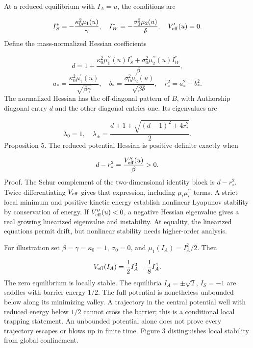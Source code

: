 \documentclass[aip,adv,preprint,floatfix]{revtex4-2}
\begin{document}
At a reduced equilibrium with $I_A=u$, the conditions are

\begin{equation}
I_S^*=-\frac{\kappa_0^2\mu_1(u)}{\gamma},\quad I_W^*=-\frac{\sigma_0^2\mu_2(u)}{\delta},\quad V_{\rm eff}^\prime(u)=0.
\end{equation}
Define the mass-normalized Hessian coefficients

\begin{equation}
d=1+\frac{\kappa_0^2\mu_1^{\prime\prime}(u)I_S^*+\sigma_0^2\mu_2^{\prime\prime}(u)I_W^*}{\beta},
\end{equation}
\begin{equation}
a_*=\frac{\kappa_0^2\mu_1^\prime(u)}{\sqrt{\beta\gamma}},\quad b_*=\frac{\sigma_0^2\mu_2^\prime(u)}{\sqrt{\beta\delta}},\quad r_*^2=a_*^2+b_*^2.
\end{equation}
The normalized Hessian has the off-diagonal pattern of $B$, with Authorship diagonal entry $d$ and the other diagonal entries one. Its eigenvalues are

\begin{equation}
\lambda_0=1,\quad \lambda_\pm=\frac{d+1\pm\sqrt{(d-1)^2+4r_*^2}}{2}.
\end{equation}
Proposition 5. The reduced potential Hessian is positive definite exactly when

\begin{equation}
d-r_*^2=\frac{V_{\rm eff}^{\prime\prime}(u)}{\beta}>0.
\end{equation}
Proof. The Schur complement of the two-dimensional identity block is $d-r_*^2$. Twice differentiating $V_{\rm eff}$ gives that expression, including $\mu_i\mu_i^{\prime\prime}$ terms. A strict local minimum and positive kinetic energy establish nonlinear Lyapunov stability by conservation of energy. If $V_{\rm eff}^{\prime\prime}(u)<0$, a negative Hessian eigenvalue gives a real growing linearized eigenvalue and instability. At equality, the linearized equations permit drift, but nonlinear stability needs higher-order analysis.

For illustration set $\beta=\gamma=\kappa_0=1$, $\sigma_0=0$, and $\mu_1(I_A)=I_A^2/2$. Then

\begin{equation}
V_{\rm eff}(I_A)=\frac12I_A^2-\frac18I_A^4.
\end{equation}
The zero equilibrium is locally stable. The equilibria $I_A=\pm\sqrt2$, $I_S=-1$ are saddles with barrier energy $1/2$. The full potential is nonetheless unbounded below along its minimizing valley. A trajectory in the central potential well with reduced energy below $1/2$ cannot cross the barrier; this is a conditional local trapping statement. An unbounded potential alone does not prove every trajectory escapes or blows up in finite time. Figure 3 distinguishes local stability from global confinement.
\end{document}
